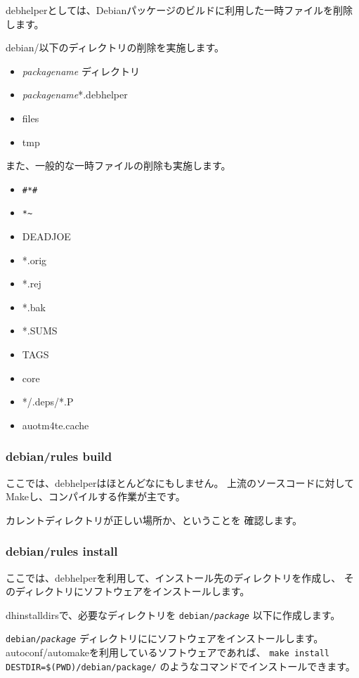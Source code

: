 \documentclass[mingoth,a4paper]{jsarticle}
\begin{document}
debhelperとしては、Debianパッケージのビルドに利用した一時ファイルを削除
します。

debian/以下のディレクトリの削除を実施します。
\begin{itemize}
 \item {\it packagename} ディレクトリ
 \item  {\it packagename}*.debhelper
 \item files
 \item tmp
\end{itemize}

また、一般的な一時ファイルの削除も実施します。
\begin{itemize}
 \item \verb!#*#!
 \item \verb!*~!
 \item DEADJOE
 \item *.orig
 \item *.rej
 \item *.bak
 \item *.SUMS
 \item TAGS
 \item core
 \item */.deps/*.P
 \item auotm4te.cache
\end{itemize}


\subsubsection{debian/rules build}

ここでは、debhelperはほとんどなにもしません。
上流のソースコードに対してMakeし、コンパイルする作業が主です。

カレントディレクトリが正しい場所か、ということを
確認します。

\subsubsection{debian/rules install}

ここでは、debhelperを利用して、インストール先のディレクトリを作成し、
そのディレクトリにソフトウェアをインストールします。

dh\underbar{ }installdirsで、必要なディレクトリを
{\tt debian/{\it package}}
以下に作成します。

{\tt debian/{\it package}}
ディレクトリににソフトウェアをインストールします。
autoconf/automakeを利用しているソフトウェアであれば、
\verb!make install DESTDIR=$(PWD)/debian/package/!
のようなコマンドでインストールできます。
\end{document}
